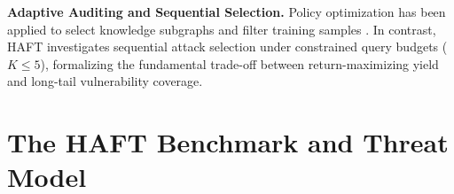 \documentclass[11pt]{article}
\begin{document}
\begin{table}[!t]
\caption{Systematic comparison of HAFT with related fact-checking and adversarial benchmarks. TM: Threat Models (C=Claim, E=Evidence); Gate: Deterministic Script Gating; Aud.: Budgeted Adaptive Auditing ($K \le 5$); Cov.: Coverage vs.\ Yield. Note: TextFlint evaluates multilingual NLP robustness, but does not benchmark Hindi evidence poisoning or budgeted coverage.}
\label{tab:comparison}
\centering
\begingroup
\renewcommand{\arraystretch}{0.88}
\endgroup
\end{table}

\textbf{Adaptive Auditing and Sequential Selection.} Policy optimization has been applied to select knowledge subgraphs \citep{zhang2024akafake} and filter training samples \citep{yang2024reinforcement}. In contrast, HAFT investigates sequential attack selection under constrained query budgets ($K \le 5$), formalizing the fundamental trade-off between return-maximizing yield and long-tail vulnerability coverage.

\section{The HAFT Benchmark and Threat Model}
\label{sec:benchmark}
\end{document}

